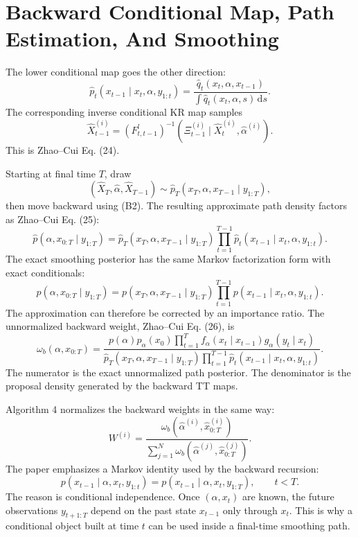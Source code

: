 \documentclass[11pt]{article}
\newcommand{\dd}{\,\mathrm d}
\begin{document}
\section{Backward Conditional Map, Path Estimation, And Smoothing}

The lower conditional map goes the other direction:
\[
    \widehat p_t(x_{t-1}\mid x_t,\alpha,y_{1:t})
    =
    \frac{\widehat q_t(x_t,\alpha,x_{t-1})}
    {\int \widehat q_t(x_t,\alpha,s)\dd s}.
    \tag{B1}
\]
The corresponding inverse conditional KR map samples
\[
    \widehat X_{t-1}^{(i)}
    =
    (F_{t,t-1}^{l})^{-1}
    \left(\Xi_{t-1}^{(i)}\mid \widehat X_t^{(i)},\widehat\alpha^{(i)}\right).
    \tag{B2}
\]
This is Zhao--Cui Eq. (24).

Starting at final time \(T\), draw
\[
    (\widehat X_T,\widehat\alpha,\widehat X_{T-1})
    \sim
    \widehat p_T(x_T,\alpha,x_{T-1}\mid y_{1:T}),
\]
then move backward using (B2).  The resulting approximate path density factors
as Zhao--Cui Eq. (25):
\[
    \widehat p(\alpha,x_{0:T}\mid y_{1:T})
    =
    \widehat p_T(x_T,\alpha,x_{T-1}\mid y_{1:T})
    \prod_{t=1}^{T-1}
    \widehat p_t(x_{t-1}\mid x_t,\alpha,y_{1:t}).
    \tag{B3}
\]
The exact smoothing posterior has the same Markov factorization form with exact
conditionals:
\[
    p(\alpha,x_{0:T}\mid y_{1:T})
    =
    p(x_T,\alpha,x_{T-1}\mid y_{1:T})
    \prod_{t=1}^{T-1}
    p(x_{t-1}\mid x_t,\alpha,y_{1:t}).
    \tag{B4}
\]
The approximation can therefore be corrected by an importance ratio.  The
unnormalized backward weight, Zhao--Cui Eq. (26), is
\[
    \omega_b(\alpha,x_{0:T})
    =
    \frac{
    p(\alpha)p_\alpha(x_0)
    \prod_{t=1}^{T}
    f_\alpha(x_t\mid x_{t-1})g_\alpha(y_t\mid x_t)}
    {
    \widehat p_T(x_T,\alpha,x_{T-1}\mid y_{1:T})
    \prod_{t=1}^{T-1}
    \widehat p_t(x_{t-1}\mid x_t,\alpha,y_{1:t})}.
    \tag{B5}
\]
The numerator is the exact unnormalized path posterior.  The denominator is the
proposal density generated by the backward TT maps.

Algorithm 4 normalizes the backward weights in the same way:
\[
    W^{(i)}
    =
    \frac{\omega_b(\widehat\alpha^{(i)},\widehat x_{0:T}^{(i)})}
    {\sum_{j=1}^{N}\omega_b(\widehat\alpha^{(j)},\widehat x_{0:T}^{(j)})}.
    \tag{B6}
\]
The paper emphasizes a Markov identity used by the backward recursion:
\[
    p(x_{t-1}\mid \alpha,x_t,y_{1:t})
    =
    p(x_{t-1}\mid \alpha,x_t,y_{1:T}),
    \qquad t<T.
    \tag{B7}
\]
The reason is conditional independence.  Once \((\alpha,x_t)\) are known, the
future observations \(y_{t+1:T}\) depend on the past state \(x_{t-1}\) only
through \(x_t\).  This is why a conditional object built at time \(t\) can be
used inside a final-time smoothing path.
\end{document}

